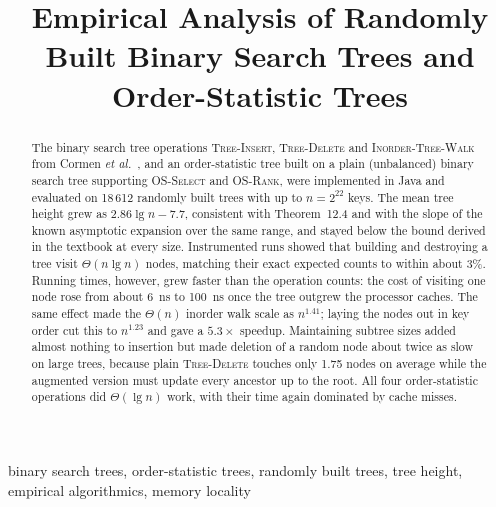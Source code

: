 \documentclass[conference]{IEEEtran}
\newcommand{\INS}{\textsc{Tree-Insert}}
\newcommand{\DEL}{\textsc{Tree-Delete}}
\newcommand{\WALK}{\textsc{Inorder-Tree-Walk}}
\newcommand{\SEL}{\textsc{OS-Select}}
\newcommand{\RANK}{\textsc{OS-Rank}}
\begin{document}
\title{Empirical Analysis of Randomly Built Binary Search Trees and Order-Statistic Trees}

\author{
}

\maketitle

\begin{abstract}
The binary search tree operations \INS{}, \DEL{} and \WALK{} from Cormen
\textit{et al.}~\cite{clrs}, and an order-statistic tree built on a plain
(unbalanced) binary search tree supporting \SEL{} and \RANK{}, were implemented
in Java and evaluated on 18\,612 randomly built trees with up to
$n = 2^{22}$ keys. The mean tree height grew as $2.86\lg n - 7.7$, consistent
with Theorem~12.4 and with the slope of the known asymptotic expansion over the
same range, and stayed below the bound derived in the textbook at every size.
Instrumented runs showed that building and destroying a tree visit
$\Theta(n\lg n)$ nodes, matching their exact expected counts to within about 3\%.
Running times, however, grew faster than the operation counts: the cost of
visiting one node rose from about \SI{6}{\nano\second} to
\SI{100}{\nano\second} once the tree outgrew the processor caches. The same
effect made the $\Theta(n)$ inorder walk scale as $n^{1.41}$; laying the nodes
out in key order cut this to $n^{1.23}$ and gave a $5.3\times$ speedup.
Maintaining subtree sizes added almost nothing to insertion but made deletion
of a random node about twice as slow on large trees, because plain \DEL{}
touches only 1.75 nodes on average while the augmented version must update
every ancestor up to the root. All four order-statistic operations did
$\Theta(\lg n)$ work, with their time again dominated by cache misses.
\end{abstract}

\begin{IEEEkeywords}
binary search trees, order-statistic trees, randomly built trees, tree height,
empirical algorithmics, memory locality
\end{IEEEkeywords}

\end{document}
